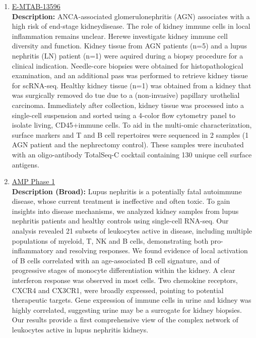 \documentclass[times, twoside, watermark]{zHenriquesLab-StyleBioRxiv}
\begin{document}
\begin{enumerate}
	\item \href{https://www.ebi.ac.uk/biostudies/arrayexpress/studies/E-MTAB-13596}{E-MTAB-13596} \cite{yostavegting2024}
			\\ \textbf{Description:}
			ANCA-associated glomerulonephritis (AGN) associates with a high risk of end-stage kidneydisease. The role of kidney immune cells in local inflammation remains unclear. Herewe investigate kidney immune cell diversity and function. Kidney tissue from AGN patients (n=5) and a lupus nephritis (LN) patient (n=1) were aquired during a biopsy procedure for a clinical indication. Needle-core biopsies were obtained for histopathological examination, and an additional pass was performed to retrieve kidney tissue for scRNA-seq. Healthy kidney tissue (n=1) was obtained from a kidney that was surgically removed do tue due to a (non-invasive) papillary urothelial carcinoma. Immediately after collection, kidney tissue was processed into a single-cell suspension and sorted using a 4-color flow cytometry panel to isolate living, CD45+immune cells. To aid in the multi-omic characterization, surface markers and T and B cell repertoires were sequenced in 2 samples (1 AGN patient and the nephrectomy control). These samples were incubated with an oligo-antibody TotalSeq-C cocktail containing 130 unique cell surface antigens.
	\item \href{https://singlecell.broadinstitute.org/single_cell/study/SCP279/amp-phase-1}{AMP Phase 1} \cite{arazi2019} \cite{der2019} 
			\\ \textbf{Description (Broad):}
			Lupus nephritis is a potentially fatal autoimmune disease, whose current treatment is ineffective and often toxic. To gain insights into disease mechanisms, we analyzed kidney samples from lupus nephritis patients and healthy controls using single-cell RNA-seq. Our analysis revealed 21 subsets of leukocytes active in disease, including multiple populations of myeloid, T, NK and B cells, demonstrating both pro-inflammatory and resolving responses. We found evidence of local activation of B cells correlated with an age-associated B cell signature, and of progressive stages of monocyte differentiation within the kidney. A clear interferon response was observed in most cells. Two chemokine receptors, CXCR4 and CX3CR1, were broadly expressed, pointing to potential therapeutic targets. Gene expression of immune cells in urine and kidney was highly correlated, suggesting urine may be a surrogate for kidney biopsies. Our results provide a first comprehensive view of the complex network of leukocytes active in lupus nephritis kidneys.

\end{enumerate}
\end{document}

